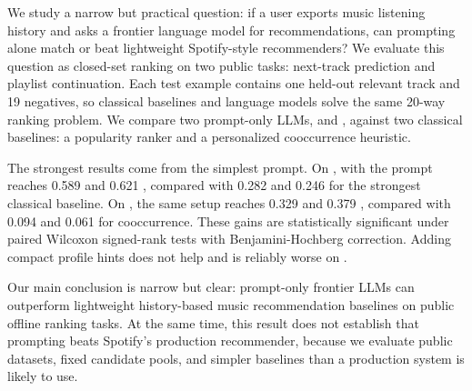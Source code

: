 We study a narrow but practical question: if a user exports music listening history and asks a frontier language model for recommendations, can prompting alone match or beat lightweight Spotify-style recommenders? We evaluate this question as closed-set ranking on two public tasks: \lastfm next-track prediction and \mpd playlist continuation. Each test example contains one held-out relevant track and 19 negatives, so classical baselines and language models solve the same 20-way ranking problem. We compare two prompt-only LLMs, \gptfourone and \claudesonnet, against two classical baselines: a popularity ranker and a personalized cooccurrence heuristic.

The strongest results come from the simplest prompt. On \lastfm, \gptfourone with the \minimalprompt prompt reaches 0.589 \mrr and 0.621 \ndcg, compared with 0.282 \mrr and 0.246 \ndcg for the strongest classical baseline. On \mpd, the same setup reaches 0.329 \mrr and 0.379 \ndcg, compared with 0.094 \mrr and 0.061 \ndcg for cooccurrence. These gains are statistically significant under paired Wilcoxon signed-rank tests with Benjamini-Hochberg correction. Adding compact profile hints does not help and is reliably worse on \mpd.

Our main conclusion is narrow but clear: prompt-only frontier LLMs can outperform lightweight history-based music recommendation baselines on public offline ranking tasks. At the same time, this result does not establish that prompting beats Spotify's production recommender, because we evaluate public datasets, fixed candidate pools, and simpler baselines than a production system is likely to use.
